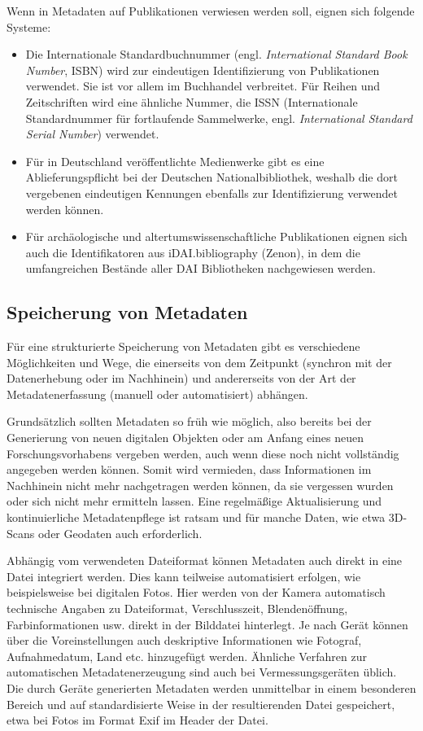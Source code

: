 Wenn in Metadaten auf Publikationen verwiesen werden soll, eignen sich folgende Systeme:
\begin{itemize}
	\item Die Internationale Standardbuchnummer (engl. \emph{International Standard Book Number}, ISBN) wird zur eindeutigen Identifizierung von Publikationen verwendet. Sie ist vor allem im Buchhandel verbreitet. Für Reihen und Zeitschriften wird eine ähnliche Nummer, die ISSN (Internationale Standardnummer für fortlaufende Sammelwerke, engl. \emph{International Standard Serial Number}) verwendet.
	\item Für in Deutschland veröffentlichte Medienwerke gibt es eine Ablieferungspflicht bei der Deutschen Nationalbibliothek, weshalb die dort vergebenen  eindeutigen Kennungen ebenfalls zur Identifizierung verwendet werden können.
	\item Für archäologische und altertumswissenschaftliche Publikationen eignen sich auch die Identifikatoren aus iDAI.bibliography (Zenon), in dem die umfangreichen Bestände aller DAI Bibliotheken nachgewiesen werden.
\end{itemize}

\label{metadatenSpeicherung}
\subsection{Speicherung von Metadaten}
Für eine strukturierte Speicherung von Metadaten gibt es verschiedene Möglichkeiten und Wege, die einerseits von dem Zeitpunkt (synchron mit der Datenerhebung oder im Nachhinein) und andererseits von der Art der Metadatenerfassung (manuell oder automatisiert) abhängen. 

Grundsätzlich sollten Metadaten so früh wie möglich, also bereits bei der Generierung von neuen digitalen Objekten oder am Anfang eines neuen Forschungsvorhabens vergeben werden, auch wenn diese noch nicht vollständig angegeben werden können. Somit wird vermieden, dass Informationen im Nachhinein nicht mehr nachgetragen werden können, da sie vergessen wurden oder sich nicht mehr ermitteln lassen. Eine regelmäßige Aktualisierung und kontinuierliche Metadatenpflege ist ratsam und für manche Daten, wie etwa 3D-Scans oder Geodaten auch erforderlich.

Abhängig vom verwendeten Dateiformat können Metadaten auch direkt in eine Datei integriert werden. Dies kann teilweise automatisiert erfolgen, wie beispielsweise bei digitalen Fotos. Hier werden von der Kamera automatisch technische Angaben zu Dateiformat, Verschlusszeit, Blendenöffnung, Farbinformationen usw. direkt in der Bilddatei hinterlegt. Je nach Gerät können über die Voreinstellungen auch deskriptive Informationen wie Fotograf, Aufnahmedatum, Land etc. hinzugefügt werden. Ähnliche Verfahren zur automatischen Metadatenerzeugung sind auch bei Vermessungsgeräten üblich. Die durch Geräte generierten Metadaten werden unmittelbar in einem besonderen Bereich und auf standardisierte Weise in der resultierenden Datei gespeichert, etwa bei Fotos im Format Exif im Header der Datei.

